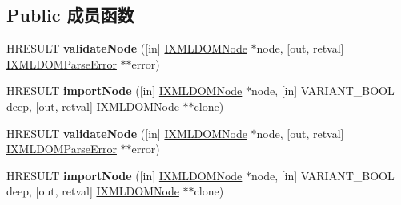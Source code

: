 \subsection*{Public 成员函数}
\begin{DoxyCompactItemize}
\item 
\mbox{\label{interface_m_s_x_m_l2_1_1_i_x_m_l_d_o_m_document3_a007c55f447475ecfeed0fd31033cb9bc}} 
H\+R\+E\+S\+U\+LT {\bfseries validate\+Node} (\mbox{[}in\mbox{]} \hyperlink{interface_m_s_x_m_l2_1_1_i_x_m_l_d_o_m_node}{I\+X\+M\+L\+D\+O\+M\+Node} $\ast$node, \mbox{[}out, retval\mbox{]} \hyperlink{interface_m_s_x_m_l2_1_1_i_x_m_l_d_o_m_parse_error}{I\+X\+M\+L\+D\+O\+M\+Parse\+Error} $\ast$$\ast$error)
\item 
\mbox{\label{interface_m_s_x_m_l2_1_1_i_x_m_l_d_o_m_document3_a3ab8ed71a9a39481ebec1a4fa168a0cf}} 
H\+R\+E\+S\+U\+LT {\bfseries import\+Node} (\mbox{[}in\mbox{]} \hyperlink{interface_m_s_x_m_l2_1_1_i_x_m_l_d_o_m_node}{I\+X\+M\+L\+D\+O\+M\+Node} $\ast$node, \mbox{[}in\mbox{]} V\+A\+R\+I\+A\+N\+T\+\_\+\+B\+O\+OL deep, \mbox{[}out, retval\mbox{]} \hyperlink{interface_m_s_x_m_l2_1_1_i_x_m_l_d_o_m_node}{I\+X\+M\+L\+D\+O\+M\+Node} $\ast$$\ast$clone)
\item 
\mbox{\label{interface_m_s_x_m_l2_1_1_i_x_m_l_d_o_m_document3_a007c55f447475ecfeed0fd31033cb9bc}} 
H\+R\+E\+S\+U\+LT {\bfseries validate\+Node} (\mbox{[}in\mbox{]} \hyperlink{interface_m_s_x_m_l2_1_1_i_x_m_l_d_o_m_node}{I\+X\+M\+L\+D\+O\+M\+Node} $\ast$node, \mbox{[}out, retval\mbox{]} \hyperlink{interface_m_s_x_m_l2_1_1_i_x_m_l_d_o_m_parse_error}{I\+X\+M\+L\+D\+O\+M\+Parse\+Error} $\ast$$\ast$error)
\item 
\mbox{\label{interface_m_s_x_m_l2_1_1_i_x_m_l_d_o_m_document3_a3ab8ed71a9a39481ebec1a4fa168a0cf}} 
H\+R\+E\+S\+U\+LT {\bfseries import\+Node} (\mbox{[}in\mbox{]} \hyperlink{interface_m_s_x_m_l2_1_1_i_x_m_l_d_o_m_node}{I\+X\+M\+L\+D\+O\+M\+Node} $\ast$node, \mbox{[}in\mbox{]} V\+A\+R\+I\+A\+N\+T\+\_\+\+B\+O\+OL deep, \mbox{[}out, retval\mbox{]} \hyperlink{interface_m_s_x_m_l2_1_1_i_x_m_l_d_o_m_node}{I\+X\+M\+L\+D\+O\+M\+Node} $\ast$$\ast$clone)
\item 
\mbox{\label{interface_m_s_x_m_l2_1_1_i_x_m_l_d_o_m_document3_a007c55f447475ecfeed0fd31033cb9bc}} 

\end{DoxyCompactItemize}
